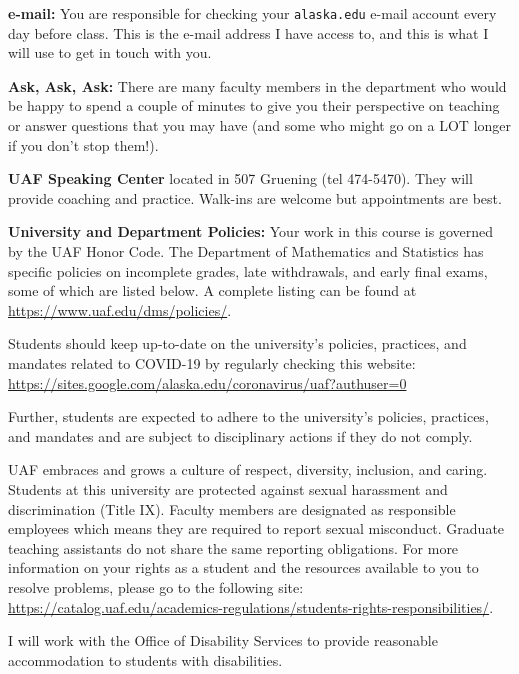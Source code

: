 \documentclass[12pt]{article}
\begin{document}
\textbf{e-mail:} {You are responsible for checking your {\tt alaska.edu} e-mail account every day before class.} This is the e-mail address I have access to, and this is what I will use to get in touch with you.

\noindent\textbf{Ask, Ask, Ask:}  There are many faculty members in the department who would be happy to spend a couple of minutes to give you their perspective on teaching or answer questions that you may have (and some who might go on a LOT longer if you don't stop them!).

\textbf{UAF Speaking Center} located in 507 Gruening (tel 474-5470). They will provide coaching and practice. Walk-ins are welcome but appointments are best.

\textbf{University and Department Policies:} Your work in this course is governed by the UAF Honor
Code. The Department of Mathematics and Statistics has specific policies on incomplete grades,
late withdrawals, and early final exams, some of which are listed below. A complete listing
can be found at
\url{https://www.uaf.edu/dms/policies/}.

 Students should keep up-to-date on the university's policies, practices, and mandates related to COVID-19 by regularly checking this website: \url{https://sites.google.com/alaska.edu/coronavirus/uaf?authuser=0}

Further, students are expected to adhere to the university's policies, practices, and mandates and are subject to disciplinary actions if they do not comply.

 UAF embraces and grows a culture of respect, diversity, inclusion, and caring. Students at this university are protected against sexual harassment and discrimination (Title IX). Faculty members are designated as responsible employees which means they are required to report sexual misconduct. Graduate teaching assistants do not share the same reporting obligations. For more information on your rights as a student and the resources available to you to resolve problems, please go to the following site: \url{https://catalog.uaf.edu/academics-regulations/students-rights-responsibilities/}.

 I will work with the Office of Disability Services to provide reasonable accommodation to students with disabilities.
\end{document}
